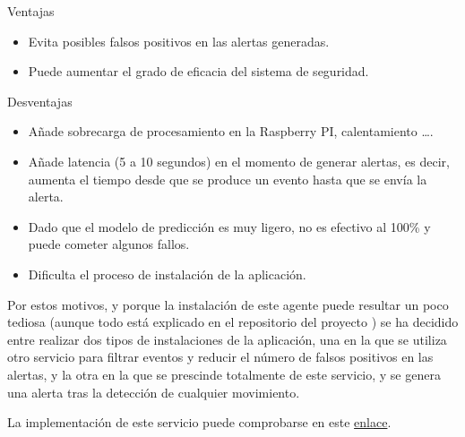 Ventajas

\begin{itemize}

\vspace{-0.5cm}

\item Evita posibles falsos positivos en las alertas generadas.
\item Puede aumentar el grado de eficacia del sistema de seguridad.
\end{itemize}

Desventajas

\vspace{-0.5cm}

\begin{itemize}
\item Añade sobrecarga de procesamiento en la Raspberry PI, calentamiento \ldots.
\item Añade latencia (5 a 10 segundos) en el momento de generar alertas, es decir, aumenta el tiempo desde que se produce un evento hasta que se envía la alerta.
\item Dado que el modelo de predicción es muy ligero, no es efectivo al 100\% y puede cometer algunos fallos.
\item Dificulta el proceso de instalación de la aplicación.
\end{itemize}

Por estos motivos, y porque la instalación de este agente puede resultar un poco tediosa (aunque todo está explicado en el repositorio del proyecto \cite{ref1}) se ha decidido entre realizar dos tipos de instalaciones de la aplicación, una en la que se utiliza otro servicio para filtrar eventos y reducir el número de falsos positivos en las alertas, y la otra en la que se prescinde totalmente de este servicio, y se genera una alerta tras la detección de cualquier movimiento.

La implementación de este servicio puede comprobarse en este \href{https://github.com/jmv74211/TFM_security_system_PI/blob/master/src/agents/object_detector_agent.py}{enlace}.



